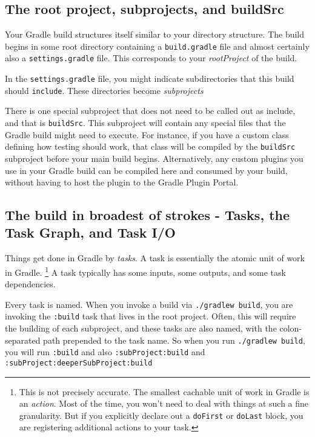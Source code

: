 \documentclass[]{article}
\theoremstyle{definition}
\begin{document}
\subsection{The root project, subprojects, and buildSrc}

Your Gradle build structures itself similar to your directory structure.
The build begins in some root directory containing a \texttt{build.gradle} file and almost certainly also a \texttt{settings.gradle} file.
This corresponds to your \emph{rootProject} of the build.

In the \texttt{settings.gradle} file, you might indicate subdirectories that this build should \texttt{include}.
These directories become \emph{subprojects}

There is one special subproject that does not need to be called out as include, and that is \texttt{buildSrc}.
This subproject will contain any special files that the Gradle build might need to execute.
For instance, if you have a custom class defining how testing should work, that class will be compiled by the \texttt{buildSrc} subproject before your main build begins.
Alternatively, any custom plugins you use in your Gradle build can be compiled here and consumed by your build, without having to host the plugin to the Gradle Plugin Portal.

\subsection{The build in broadest of strokes - Tasks, the Task Graph, and Task I/O}

Things get done in Gradle by \emph{tasks}.
A task is essentially the atomic unit of work in Gradle.%
\footnote{This is not precisely accurate.
  The smallest cachable unit of work in Gradle is an \emph{action}.
  Most of the time, you won't need to deal with things at such a fine granularity.
  But if you explicitly declare out a \texttt{doFirst} or \texttt{doLast} block, you are registering additional actions to your task.
}
A task typically has some inputs, some outputs, and some task dependencies.

Every task is named.
When you invoke a build via \texttt{./gradlew build}, you are invoking the \texttt{:build} task that lives in the root project.
Often, this will require the building of each subproject, and these tasks are also named, with the colon-separated path prepended to the task name.
So when you run \texttt{./gradlew build}, you will run \texttt{:build} and also \texttt{:subProject:build} and \texttt{:subProject:deeperSubProject:build}
\end{document}
